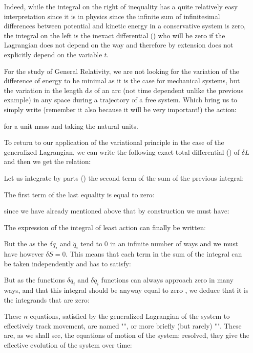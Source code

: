 	Indeed, while the integral on the right of inequality has a quite relatively easy interpretation since it is in physics since the infinite sum of infinitesimal differences between potential and kinetic energy in a conservative system is zero, the integral on the left is the inexact differential () who will be zero if the Lagrangian does not depend on the way and therefore by extension does not explicitly depend on the variable $t$.
	\begin{tcolorbox}[title=Remark,colframe=black,arc=10pt]
	For the study of General Relativity, we are not looking for the variation of the difference of energy to be minimal as it is the case for mechanical systems, but the variation in the length $\mathrm{d}s$ of an arc (not time dependent unlike the previous example) in any space during a trajectory of a free system. Which bring us to simply write (remember it also because it will be very important!) the action:
	
	for a unit mass and taking the natural units.
	\end{tcolorbox}
	To return to our application of the variational principle in the case of the generalized Lagrangian, we can write the following exact total differential () of $\delta L$ and then we get the relation:
	
	Let us integrate by parts () the second term of the sum of the previous integral:
	
	The first term of the last equality is equal to zero:
	
	since we have already mentioned above that by construction we must have:
	
	The expression of the integral of least action can finally be written:
	
	But the as the $\delta q_i$ and $\dot{q}_i$ tend to $0$ in an infinite number of ways and we must have however $\delta S=0$. This means that each term in the sum of the integral can be taken independently and has to satisfy:
	
	But as the functions $\delta q_i$ and $\delta \dot{q}_i$ functions can always approach zero in many ways, and that this integral should be anyway equal to zero , we deduce that it is the integrands that are zero:
	
	These $n$ equations, satisfied by the generalized Lagrangian of the system to effectively track movement, are named "", or more briefly (but rarely) "". These are, as we shall see, the equations of motion of the system: resolved, they give the effective evolution of the system over time:
	
